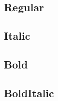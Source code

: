 \documentclass{article}
\begin{document}
\subsection*{Regular}
\lipsum[1]

\subsection*{Italic}
\textit{\lipsum[2]}

\subsection*{Bold}
\textbf{\lipsum[3]}

\subsection*{BoldItalic}
\textbf{\textit{\lipsum[4]}}
\end{document}
